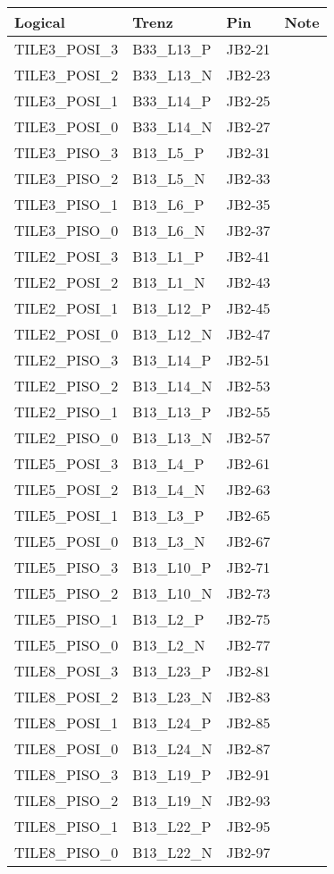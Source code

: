 \documentclass[12pt]{article}
\begin{document}
\newpage
\begin{tabular}{llll}
\hline
Logical & Trenz & Pin & Note\\  
\hline
TILE3\_POSI\_3     & B33\_L13\_P  & JB2-21 & \\
TILE3\_POSI\_2     & B33\_L13\_N  & JB2-23 & \\
TILE3\_POSI\_1     & B33\_L14\_P  & JB2-25 & \\
TILE3\_POSI\_0     & B33\_L14\_N  & JB2-27 & \\
\hline
TILE3\_PISO\_3     & B13\_L5\_P   & JB2-31 & \\
TILE3\_PISO\_2     & B13\_L5\_N   & JB2-33 & \\
TILE3\_PISO\_1     & B13\_L6\_P   & JB2-35 & \\
TILE3\_PISO\_0     & B13\_L6\_N   & JB2-37 & \\
\hline
TILE2\_POSI\_3     & B13\_L1\_P   & JB2-41 & \\
TILE2\_POSI\_2     & B13\_L1\_N   & JB2-43 & \\
TILE2\_POSI\_1     & B13\_L12\_P  & JB2-45 & \\
TILE2\_POSI\_0     & B13\_L12\_N  & JB2-47 & \\
\hline
TILE2\_PISO\_3     & B13\_L14\_P  & JB2-51 & \\
TILE2\_PISO\_2     & B13\_L14\_N  & JB2-53 & \\
TILE2\_PISO\_1     & B13\_L13\_P  & JB2-55 & \\
TILE2\_PISO\_0     & B13\_L13\_N  & JB2-57 & \\
\hline
TILE5\_POSI\_3     & B13\_L4\_P   & JB2-61 & \\
TILE5\_POSI\_2     & B13\_L4\_N   & JB2-63 & \\
TILE5\_POSI\_1     & B13\_L3\_P   & JB2-65 & \\
TILE5\_POSI\_0     & B13\_L3\_N   & JB2-67 & \\
\hline
TILE5\_PISO\_3     & B13\_L10\_P  & JB2-71 & \\
TILE5\_PISO\_2     & B13\_L10\_N  & JB2-73 & \\
TILE5\_PISO\_1     & B13\_L2\_P   & JB2-75 & \\
TILE5\_PISO\_0     & B13\_L2\_N   & JB2-77 & \\
\hline
TILE8\_POSI\_3     & B13\_L23\_P  & JB2-81 & \\
TILE8\_POSI\_2     & B13\_L23\_N  & JB2-83 & \\
TILE8\_POSI\_1     & B13\_L24\_P  & JB2-85 & \\
TILE8\_POSI\_0     & B13\_L24\_N  & JB2-87 & \\
\hline
TILE8\_PISO\_3     & B13\_L19\_P  & JB2-91 & \\
TILE8\_PISO\_2     & B13\_L19\_N  & JB2-93 & \\
TILE8\_PISO\_1     & B13\_L22\_P  & JB2-95 & \\
TILE8\_PISO\_0     & B13\_L22\_N  & JB2-97 & \\
\hline
\end{tabular}
\end{document}
